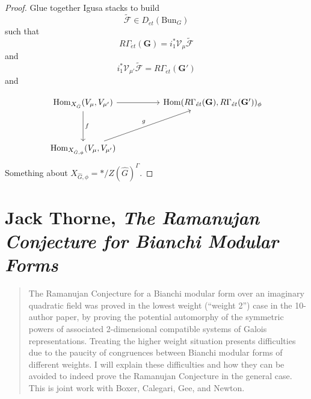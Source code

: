 \documentclass[reqno]{amsart} 
\begin{document}
\begin{proof}
  Glue together Igusa stacks to build
  \begin{equation*}
    \tilde{\mathcal{F}}
    \in D_{\acute{e}t}(\mathrm{Bun}_G)
  \end{equation*}
  such that
  \begin{equation*}
    R \Gamma_{\acute{e}t}(\mathbf{G}) = i_1^\ast
    \mathcal{V}_\mu  \tilde{\mathcal{F}}
  \end{equation*}
  and
  \begin{equation*}
    i_1^\ast \mathcal{V}_{\mu '} \tilde{\mathcal{F}} =
    R \Gamma_{\acute{e}t}(\mathbf{G} ')
  \end{equation*}
  and

  \begin{equation*}
    \begin{tikzcd}
      \Hom_{X_{\hat{G}}}(V_\mu, V_{\mu'}) \arrow[dd, "f"] \arrow[rr] & & \Hom(R \Gamma_{\acute{e}t}(\mathbf{G}), R \Gamma_{\acute{e}t}(\mathbf{G}'))_{\phi} \\
      & & \\
      \Hom_{X_{\hat{G}, \phi}}(V_{\mu}, V_{\mu '}) \arrow[uurr, "g"] & & 
    \end{tikzcd}
  \end{equation*}
  Something about $X_{\hat{G}, \phi} = \ast / Z(\hat{G})^\Gamma$.
\end{proof}

\part{Jack Thorne, \emph{The Ramanujan Conjecture for Bianchi Modular Forms}}

\begin{abstract}
  The Ramanujan Conjecture for a Bianchi modular form over an imaginary quadratic field was proved in the lowest weight (“weight 2”) case in the 10-author paper, by proving the potential automorphy of the symmetric powers of associated 2-dimensional compatible systems of Galois representations. Treating the higher weight situation presents difficulties due to the paucity of congruences between Bianchi modular forms of different weights. I will explain these difficulties and how they can be avoided to indeed prove the Ramanujan Conjecture in the general case. This is joint work with Boxer, Calegari, Gee, and Newton.
\end{abstract}
\end{document}
